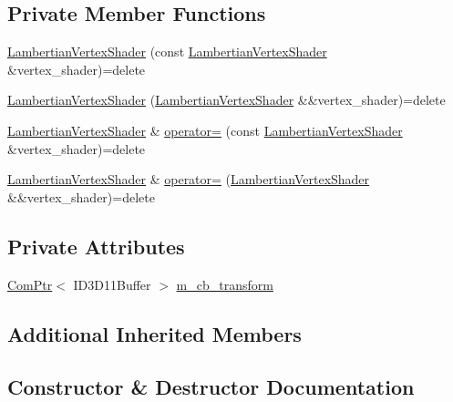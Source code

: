 \subsection*{Private Member Functions}
\begin{DoxyCompactItemize}
\item 
\hyperlink{classmage_1_1_lambertian_vertex_shader_add164d66906e307d95232b2c41567a21}{Lambertian\+Vertex\+Shader} (const \hyperlink{classmage_1_1_lambertian_vertex_shader}{Lambertian\+Vertex\+Shader} \&vertex\+\_\+shader)=delete
\item 
\hyperlink{classmage_1_1_lambertian_vertex_shader_a1202feaaeb64148207e2fb10290a09c8}{Lambertian\+Vertex\+Shader} (\hyperlink{classmage_1_1_lambertian_vertex_shader}{Lambertian\+Vertex\+Shader} \&\&vertex\+\_\+shader)=delete
\item 
\hyperlink{classmage_1_1_lambertian_vertex_shader}{Lambertian\+Vertex\+Shader} \& \hyperlink{classmage_1_1_lambertian_vertex_shader_a974b43346ab5d8081d9101f715e7670d}{operator=} (const \hyperlink{classmage_1_1_lambertian_vertex_shader}{Lambertian\+Vertex\+Shader} \&vertex\+\_\+shader)=delete
\item 
\hyperlink{classmage_1_1_lambertian_vertex_shader}{Lambertian\+Vertex\+Shader} \& \hyperlink{classmage_1_1_lambertian_vertex_shader_ae0a53e712856923403c1f7542941df6e}{operator=} (\hyperlink{classmage_1_1_lambertian_vertex_shader}{Lambertian\+Vertex\+Shader} \&\&vertex\+\_\+shader)=delete
\end{DoxyCompactItemize}
\subsection*{Private Attributes}
\begin{DoxyCompactItemize}
\item 
\hyperlink{namespacemage_ae74f374780900893caa5555d1031fd79}{Com\+Ptr}$<$ I\+D3\+D11\+Buffer $>$ \hyperlink{classmage_1_1_lambertian_vertex_shader_aae0f2411821315d89eeb982e6c30c22e}{m\+\_\+cb\+\_\+transform}
\end{DoxyCompactItemize}
\subsection*{Additional Inherited Members}


\subsection{Constructor \& Destructor Documentation}
\hypertarget{classmage_1_1_lambertian_vertex_shader_a62fad2a28086ed7350bffbcf1ba188ed}{}\label{classmage_1_1_lambertian_vertex_shader_a62fad2a28086ed7350bffbcf1ba188ed} 
